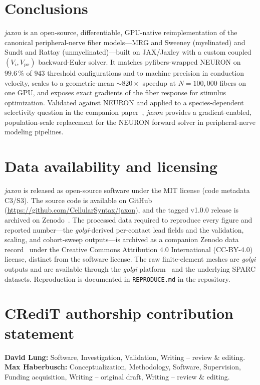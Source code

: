 \documentclass[preprint,12pt,a4paper]{elsarticle}
\begin{document}
\section{Conclusions}

\emph{jaxon} is an open-source, differentiable, GPU-native reimplementation of the canonical
peripheral-nerve fiber models---MRG and Sweeney (myelinated) and Sundt and Rattay
(unmyelinated)---built on JAX/Jaxley with a custom coupled $(V_i, V_{px})$ backward-Euler solver.
It matches pyfibers-wrapped NEURON on $99.6\,\%$ of $943$ threshold configurations and to machine
precision in conduction velocity, scales to a geometric-mean ${\sim}820\times$ speedup at
$N=100{,}000$ fibers on one GPU, and exposes exact gradients of the fiber response for
stimulus optimization. Validated against NEURON and applied to a species-dependent selectivity
question in the companion paper~\cite{companion}, \emph{jaxon} provides a gradient-enabled,
population-scale replacement for the NEURON forward solver in peripheral-nerve modeling
pipelines.

\section*{Data availability and licensing}

\emph{jaxon} is released as open-source software under the MIT license (code metadata C3/S3).
The source code is available on GitHub (\url{https://github.com/CellularSyntax/jaxon}), and the
tagged v1.0.0 release is archived on Zenodo~\cite{zenodo_jaxon_code}. The processed data required
to reproduce every figure and reported number---the \emph{golgi}-derived per-contact lead fields
and the validation, scaling, and cohort-sweep outputs---is archived as a companion Zenodo data
record~\cite{zenodo_jaxon_data} under the Creative Commons Attribution 4.0 International
(CC-BY-4.0) license, distinct from the software license. The raw finite-element meshes are
\emph{golgi} outputs and are available through the \emph{golgi} platform~\cite{golgi_platform,golgi_software}
and the underlying SPARC datasets. Reproduction is documented in \texttt{REPRODUCE.md} in the
repository.

\section*{CRediT authorship contribution statement}
\textbf{David Lung:} Software, Investigation, Validation, Writing -- review \& editing.
\textbf{Max Haberbusch:} Conceptualization, Methodology, Software, Supervision, Funding
acquisition, Writing -- original draft, Writing -- review \& editing.
\end{document}
